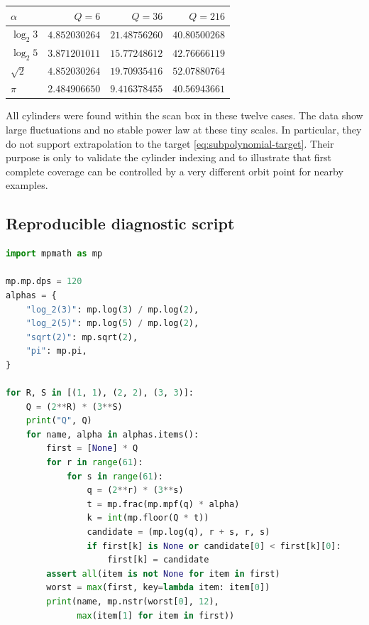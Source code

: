 \documentclass[11pt]{article}
\theoremstyle{definition}
\theoremstyle{remark}
\begin{document}
\begin{center}
\begin{tabular}{lrrr}
\toprule
$\alpha$ & $Q=6$ & $Q=36$ & $Q=216$\\
\midrule
$\log_2 3$ & $4.852030264$ & $21.48756260$ & $40.80500268$\\
$\log_2 5$ & $3.871201011$ & $15.77248612$ & $42.76666119$\\
$\sqrt2$   & $4.852030264$ & $19.70935416$ & $52.07880764$\\
$\pi$      & $2.484906650$ & $9.416378455$ & $40.56943661$\\
\bottomrule
\end{tabular}
\end{center}

All cylinders were found within the scan box in these twelve cases.  The data show
large fluctuations and no stable power law at these tiny scales.  In particular,
they do not support extrapolation to the target
\eqref{eq:subpolynomial-target}.  Their purpose is only to validate the cylinder
indexing and to illustrate that first complete coverage can be controlled by a very
different orbit point for nearby examples.

\subsection{Reproducible diagnostic script}

\begin{lstlisting}[language=Python,caption={High-precision bounded orbit scan}]
import mpmath as mp

mp.mp.dps = 120
alphas = {
    "log_2(3)": mp.log(3) / mp.log(2),
    "log_2(5)": mp.log(5) / mp.log(2),
    "sqrt(2)": mp.sqrt(2),
    "pi": mp.pi,
}

for R, S in [(1, 1), (2, 2), (3, 3)]:
    Q = (2**R) * (3**S)
    print("Q", Q)
    for name, alpha in alphas.items():
        first = [None] * Q
        for r in range(61):
            for s in range(61):
                q = (2**r) * (3**s)
                t = mp.frac(mp.mpf(q) * alpha)
                k = int(mp.floor(Q * t))
                candidate = (mp.log(q), r + s, r, s)
                if first[k] is None or candidate[0] < first[k][0]:
                    first[k] = candidate
        assert all(item is not None for item in first)
        worst = max(first, key=lambda item: item[0])
        print(name, mp.nstr(worst[0], 12),
              max(item[1] for item in first))
\end{lstlisting}
\end{document}
